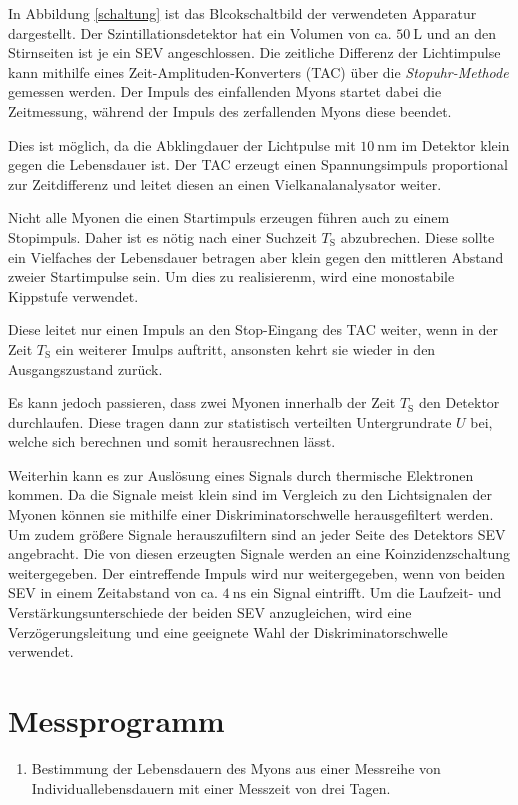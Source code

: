 In Abbildung \ref{schaltung} ist das Blcokschaltbild der verwendeten Apparatur dargestellt.
Der Szintillationsdetektor hat ein Volumen von ca. $\SI{50}{\liter}$ und an den Stirnseiten ist je ein SEV angeschlossen.
Die zeitliche Differenz der Lichtimpulse kann mithilfe eines Zeit-Amplituden-Konverters (TAC) über die \textit{Stopuhr-Methode} gemessen werden.
Der Impuls des einfallenden Myons startet dabei die Zeitmessung, während der Impuls des zerfallenden Myons diese beendet.

Dies ist möglich, da die Abklingdauer der Lichtpulse mit $\SI{10}{\nano\meter}$ im Detektor klein gegen die Lebensdauer ist.
Der TAC erzeugt einen Spannungsimpuls proportional zur Zeitdifferenz und leitet diesen an einen Vielkanalanalysator weiter.

Nicht alle Myonen die einen Startimpuls erzeugen führen auch zu einem Stopimpuls.
Daher ist es nötig nach einer Suchzeit $T_\text{S}$ abzubrechen.
Diese sollte ein Vielfaches der Lebensdauer betragen aber klein gegen den mittleren Abstand zweier Startimpulse sein.
Um dies zu realisierenm, wird eine monostabile Kippstufe verwendet. 

Diese leitet nur einen Impuls an den Stop-Eingang des TAC weiter, wenn in der Zeit $T_\text{S}$ ein weiterer Imulps auftritt, ansonsten kehrt sie wieder in den Ausgangszustand zurück.

Es kann jedoch passieren, dass zwei Myonen innerhalb der Zeit $T_\text{S}$ den Detektor durchlaufen.
Diese tragen dann zur statistisch verteilten Untergrundrate $U$ bei, welche sich berechnen und somit herausrechnen lässt.

Weiterhin kann es zur Auslösung eines Signals durch thermische Elektronen kommen.
Da die Signale meist klein sind im Vergleich zu den Lichtsignalen der Myonen können sie mithilfe einer Diskriminatorschwelle herausgefiltert werden.
Um zudem größere Signale herauszufiltern sind an jeder Seite des Detektors SEV angebracht.
Die von diesen erzeugten Signale werden an eine Koinzidenzschaltung weitergegeben.
Der eintreffende Impuls wird nur weitergegeben, wenn von beiden SEV in einem Zeitabstand von ca. $\SI{4}{\nano\second}$ ein Signal eintrifft.
Um die Laufzeit- und Verstärkungsunterschiede der beiden SEV anzugleichen, wird eine Verzögerungsleitung und eine geeignete Wahl der Diskriminatorschwelle verwendet.
\FloatBarrier
\section{Messprogramm} %
\label{sec:messprogramm}

\begin{enumerate}
	\item Bestimmung der Lebensdauern des Myons aus einer Messreihe von Individuallebensdauern mit einer Messzeit von drei Tagen.
\end{enumerate}
